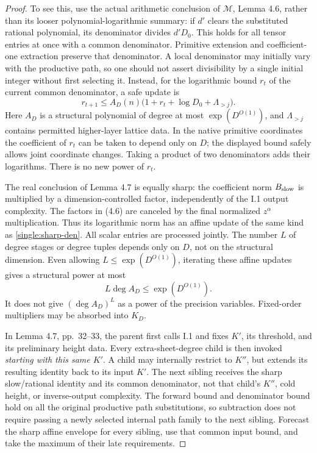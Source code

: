 \documentclass[11pt,a4paper]{article}
\theoremstyle{definition}
\newcommand{\M}{\mathcal M}
\begin{document}
\begin{proof}
To see this, use the actual arithmetic conclusion of \(\M\),
Lemma 4.6, rather than its looser polynomial-logarithmic summary:
if \(d'\) clears the substituted rational polynomial, its
denominator divides \(d'D_0\). This holds for all tensor entries
at once with a common denominator. Primitive extension and
coefficient-one extraction preserve that denominator. A local
denominator may initially vary with the productive path, so
one should not assert divisibility by a single initial integer
without first selecting it. Instead, for the logarithmic bound
\(r_t\) of the current common denominator, a safe update is
\begin{equation}\label{single:sharp-den}
 r_{t+1}\le A_D(n)\bigl(1+r_t+\log D_0+\Lambda_{>j}\bigr).
\end{equation}
Here \(A_D\) is a structural polynomial of degree at most
\(\exp(D^{O(1)})\), and \(\Lambda_{>j}\) contains permitted
higher-layer lattice data. In the native primitive coordinates
the coefficient of \(r_t\) can be taken to depend only on \(D\);
the displayed bound safely allows joint coordinate changes.
Taking a product of two denominators adds their logarithms.
There is no new power of \(r_t\).

The real conclusion of Lemma 4.7 is equally sharp: the coefficient
norm \(B_{\rm slow}\) is multiplied by a dimension-controlled factor,
independently of the I.1 output complexity. The factors in (4.6)
are canceled by the final normalized \(z^\alpha\) multiplication.
Thus its logarithmic norm has an affine update of the same kind
as \eqref{single:sharp-den}. All scalar entries are processed
jointly. The number \(L\) of degree stages or degree tuples
depends only on \(D\), not on the structural dimension. Even
allowing \(L\le\exp(D^{O(1)})\), iterating these affine
updates gives a structural power at most
\[
 L\deg A_D\le\exp(D^{O(1)}).
\]
It does not give \((\deg A_D)^L\) as a power of the
precision variables. Fixed-order multipliers may be absorbed
into \(K_D\).

In Lemma 4.7, pp.~32--33, the parent first calls I.1 and fixes
\(K'\), its threshold, and its preliminary height data. Every
extra-sheet-degree child is then invoked \emph{starting with this
same \(K'\)}. A child may internally restrict to \(K''\),
but extends its resulting identity back to its input \(K'\).
The next sibling receives the sharp slow/rational identity and
its common denominator, not that child's \(K''\), cold height,
or inverse-output complexity. The forward bound and denominator
bound hold on all the original productive path substitutions,
so subtraction does not require passing a newly selected internal
path family to the next sibling. Forecast the sharp affine
envelope for every sibling, use that common input bound, and take
the maximum of their late requirements.


\end{proof}
\end{document}
